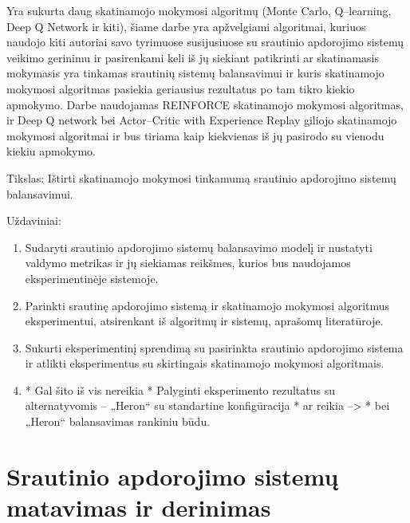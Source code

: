 \documentclass{VUMIFPSbakalaurinis}
\begin{document}
Yra sukurta daug skatinamojo mokymosi algoritmų (Monte Carlo, Q–learning, Deep Q Network ir kiti), šiame darbe yra apžvelgiami algoritmai, kuriuos naudojo kiti autoriai savo tyrimuose susijusiuose su srautinio apdorojimo sistemų veikimo gerinimu ir pasirenkami keli iš jų siekiant patikrinti ar skatinamasis mokymasis yra tinkamas srautinių sistemų balansavimui ir kuris skatinamojo mokymosi algoritmas pasiekia geriausius rezultatus po tam tikro kiekio apmokymo. Darbe naudojamas REINFORCE skatinamojo mokymosi algoritmas, ir Deep Q network bei Actor–Critic with Experience Replay giliojo skatinamojo mokymosi algoritmai ir bus tiriama kaip kiekvienas iš jų pasirodo su vienodu kiekiu apmokymo.

Tikslas: Ištirti skatinamojo mokymosi tinkamumą srautinio apdorojimo sistemų balansavimui. 

Uždaviniai:

\begin{enumerate}
    \item Sudaryti srautinio apdorojimo sistemų balansavimo modelį ir nustatyti valdymo metrikas ir jų siekiamas reikšmes, kurios bus naudojamos eksperimentinėje sistemoje.
    \item Parinkti srautinę apdorojimo sistemą ir skatinamojo mokymosi algoritmus eksperimentui, atsirenkant iš algoritmų ir sistemų, aprašomų literatūroje.
    \item Sukurti eksperimentinį sprendimą su pasirinkta srautinio apdorojimo sistema ir atlikti eksperimentus su skirtingais skatinamojo mokymosi algoritmais.
    \item * Gal šito iš vis nereikia *  Palyginti eksperimento rezultatus su alternatyvomis – „Heron“ su standartine konfigūracija  * ar reikia –> * bei „Heron“ balansavimas rankiniu būdu. 
\end{enumerate}



\section{Srautinio apdorojimo sistemų matavimas ir derinimas}
\end{document}

